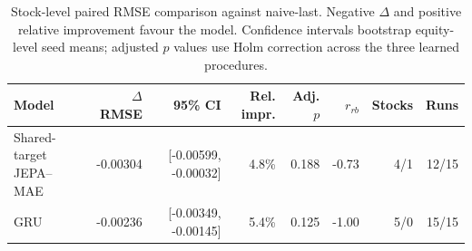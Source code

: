 \begin{table}[t]
\centering
\small
\caption{Stock-level paired RMSE comparison against naive-last. Negative $\Delta$ and positive relative improvement favour the model. Confidence intervals bootstrap equity-level seed means; adjusted $p$ values use Holm correction across the three learned procedures.}
\label{tab:paired_rmse_naive}
\begin{tabular}{lrrrrrrr}
\toprule
Model & $\Delta$RMSE & 95\% CI & Rel. impr. & Adj. $p$ & $r_{rb}$ & Stocks & Runs \\
\midrule
Shared-target JEPA--MAE & -0.00304 & [-0.00599, -0.00032] & 4.8\% & 0.188 & -0.73 & 4/1 & 12/15 \\
GRU & -0.00236 & [-0.00349, -0.00145] & 5.4\% & 0.125 & -1.00 & 5/0 & 15/15 \\
\bottomrule
\end{tabular}
\end{table}
